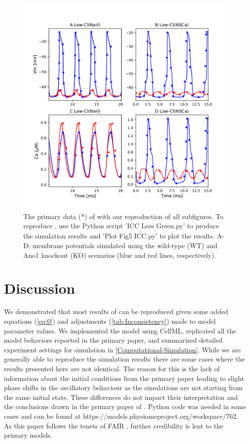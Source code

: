 \documentclass[fleqn,10pt]{physiome}
\begin{document}
\begin{figure}[ht!]%
\includegraphics[width=1\linewidth]{Figure5.pdf}
\caption{The primary data (*) of  \cite[Figure 5]{lees2014computational} with our reproduction of all subfigures. To reproduce \cite[Figure 5]{lees2014computational}, use the Python script 'ICC$_{\_}$Lees$_{\_}$Green.py' to produce the simulation results and 'Plot$_{\_}$Fig5$_{\_}$ICC.py' to plot the results. A-D: membrane potentials simulated using the wild-type (WT) and Ano1 knockout (KO) scenarios (blue and red lines, respectively).}
\label{fig:fig5}
\end{figure}



\section{Discussion}
We demonstrated that most results of \citet{lees2014computational} can be reproduced given some added equations (\autoref{eq:0}) and adjustments (\autoref{tab:Inconsistency}) made to model parameter values. We implemented the model \citep{lees2014computational} using CellML, replicated all the model behaviors reported in the primary paper, and summarized detailed
experiment settings for simulation in \autoref{Computational-Simulation}. While we are generally able to reproduce the simulation results there are some cases where the results presented here are not identical. The reason for this is the lack of information about the initial conditions from the primary paper leading to slight phase shifts in the oscillatory behaviour as the simulations are not starting from the same initial state. These differences do not impact their interpretation and the conclusions drawn in the primary paper of \citet{lees2014computational}.
Python code was needed in some cases and can be found at https://models.physiomeproject.org/workspace/762. 
As this paper follows the tenets of FAIR \citep{wilkinson2016fair}, further credibility is lent to the primary models.
\end{document}
